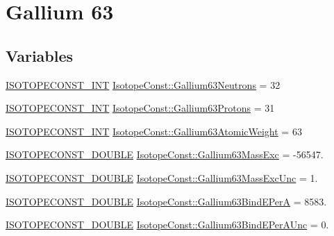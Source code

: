 \hypertarget{group___isotope_const-_gallium-_ga63}{}\section{Gallium 63}
\label{group___isotope_const-_gallium-_ga63}
\subsection*{Variables}
\begin{DoxyCompactItemize}
\item 
\mbox{\hyperlink{group___isotope_const-_macros_ga5f18360b3e99483a35c32d789e62621c}{I\+S\+O\+T\+O\+P\+E\+C\+O\+N\+S\+T\+\_\+\+I\+NT}} \mbox{\hyperlink{group___isotope_const-_gallium-_ga63_ga901d167e94ae3dd18fdffab6304d90bf}{Isotope\+Const\+::\+Gallium63\+Neutrons}} = 32
\item 
\mbox{\hyperlink{group___isotope_const-_macros_ga5f18360b3e99483a35c32d789e62621c}{I\+S\+O\+T\+O\+P\+E\+C\+O\+N\+S\+T\+\_\+\+I\+NT}} \mbox{\hyperlink{group___isotope_const-_gallium-_ga63_ga536e1bfe3d8f31dbae955ba442a33f82}{Isotope\+Const\+::\+Gallium63\+Protons}} = 31
\item 
\mbox{\hyperlink{group___isotope_const-_macros_ga5f18360b3e99483a35c32d789e62621c}{I\+S\+O\+T\+O\+P\+E\+C\+O\+N\+S\+T\+\_\+\+I\+NT}} \mbox{\hyperlink{group___isotope_const-_gallium-_ga63_ga3cd1071c668d00bfabca97cda3b48207}{Isotope\+Const\+::\+Gallium63\+Atomic\+Weight}} = 63
\item 
\mbox{\hyperlink{group___isotope_const-_macros_ga8f45a7272ce02c0b4c65c44636ed719a}{I\+S\+O\+T\+O\+P\+E\+C\+O\+N\+S\+T\+\_\+\+D\+O\+U\+B\+LE}} \mbox{\hyperlink{group___isotope_const-_gallium-_ga63_ga1d6a2b11da2076dfeaf65ed1968bfe0d}{Isotope\+Const\+::\+Gallium63\+Mass\+Exc}} = -\/56547.
\item 
\mbox{\hyperlink{group___isotope_const-_macros_ga8f45a7272ce02c0b4c65c44636ed719a}{I\+S\+O\+T\+O\+P\+E\+C\+O\+N\+S\+T\+\_\+\+D\+O\+U\+B\+LE}} \mbox{\hyperlink{group___isotope_const-_gallium-_ga63_gaa95e74455c9451341d8012e3d1798048}{Isotope\+Const\+::\+Gallium63\+Mass\+Exc\+Unc}} = 1.
\item 
\mbox{\hyperlink{group___isotope_const-_macros_ga8f45a7272ce02c0b4c65c44636ed719a}{I\+S\+O\+T\+O\+P\+E\+C\+O\+N\+S\+T\+\_\+\+D\+O\+U\+B\+LE}} \mbox{\hyperlink{group___isotope_const-_gallium-_ga63_ga89d4122bfc5a1d6118de3ebc5d2dae21}{Isotope\+Const\+::\+Gallium63\+Bind\+E\+PerA}} = 8583.
\item 
\mbox{\hyperlink{group___isotope_const-_macros_ga8f45a7272ce02c0b4c65c44636ed719a}{I\+S\+O\+T\+O\+P\+E\+C\+O\+N\+S\+T\+\_\+\+D\+O\+U\+B\+LE}} \mbox{\hyperlink{group___isotope_const-_gallium-_ga63_gafc0f1e15a7f304e22f599fe5965f9b80}{Isotope\+Const\+::\+Gallium63\+Bind\+E\+Per\+A\+Unc}} = 0.

\end{DoxyCompactItemize}
